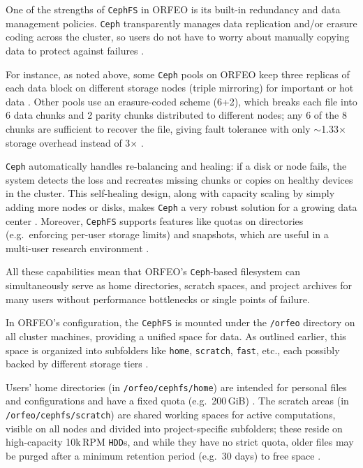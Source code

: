 \medskip

One of the strengths of \texttt{CephFS} in ORFEO is its built-in redundancy and 
data management policies. \texttt{Ceph} transparently manages data replication 
and/or erasure coding across the cluster, so users do not have to worry about 
manually copying data to protect against failures \parencite{Ceph_Pools,Ceph_EC}. 

For instance, as noted above, some \texttt{Ceph} pools on ORFEO keep three 
replicas of each data block on different storage nodes (triple mirroring) for 
important or hot data \parencite{Ceph_Pools}. Other pools use an erasure-coded 
scheme (6+2), which breaks each file into 6 data chunks and 2 parity chunks 
distributed to different nodes; any 6 of the 8 chunks are sufficient to recover 
the file, giving fault tolerance with only $\sim$1.33$\times$ storage overhead 
instead of 3$\times$ \parencite{Ceph_EC,Ceph_RADOS}. 

\texttt{Ceph} automatically handles re-balancing and healing: if a disk or node 
fails, the system detects the loss and recreates missing chunks or copies on 
healthy devices in the cluster. This self-healing design, along with capacity 
scaling by simply adding more nodes or disks, makes \texttt{Ceph} a very robust 
solution for a growing data center \parencite{Ceph_RADOS}. Moreover, 
\texttt{CephFS} supports features like quotas on directories (e.g.\ enforcing 
per-user storage limits) and snapshots, which are useful in a multi-user 
research environment \parencite{ORFEO_Docs_Storage}. 

All these capabilities mean that ORFEO’s \texttt{Ceph}-based filesystem can 
simultaneously serve as home directories, scratch spaces, and project archives 
for many users without performance bottlenecks or single points of failure.

\medskip

In ORFEO’s configuration, the \texttt{CephFS} is mounted under the 
\texttt{/orfeo} directory on all cluster machines, providing a unified space for 
data. As outlined earlier, this space is organized into subfolders like 
\texttt{home}, \texttt{scratch}, \texttt{fast}, etc., each possibly backed by 
different storage tiers \parencite{ORFEO_Docs_Storage}. 

Users’ home directories (in \texttt{/orfeo/cephfs/home}) are intended for 
personal files and configurations and have a fixed quota (e.g.\ 
200\,GiB) \parencite{ORFEO_Docs_Storage}. The scratch areas (in 
\texttt{/orfeo/cephfs/scratch}) are shared working spaces for active 
computations, visible on all nodes and divided into project-specific subfolders; 
these reside on high-capacity 10k\,RPM \texttt{HDD}s, and while they have no 
strict quota, older files may be purged after a minimum retention period (e.g.\ 
30 days) to free space \parencite{ORFEO_Docs_Storage}. 


